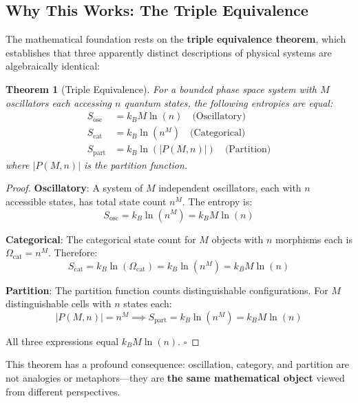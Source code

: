 \documentclass[twocolumn,10pt]{article}
\newtheorem{theorem}{Theorem}[section]
\theoremstyle{definition}
\theoremstyle{remark}
\begin{document}
\subsection{Why This Works: The Triple Equivalence}

The mathematical foundation rests on the \textbf{triple equivalence theorem}, which establishes that three apparently distinct descriptions of physical systems are algebraically identical:

\begin{theorem}[Triple Equivalence]
\label{thm:triple_equiv}
For a bounded phase space system with $M$ oscillators each accessing $n$ quantum states, the following entropies are equal:
\begin{align}
    S_{\text{osc}} &= k_B M \ln(n) \quad \text{(Oscillatory)} \\
    S_{\text{cat}} &= k_B \ln(n^M) \quad \text{(Categorical)} \\
    S_{\text{part}} &= k_B \ln(|P(M,n)|) \quad \text{(Partition)}
\end{align}
where $|P(M,n)|$ is the partition function.
\end{theorem}

\begin{proof}
\textbf{Oscillatory}: A system of $M$ independent oscillators, each with $n$ accessible states, has total state count $n^M$. The entropy is:
\begin{equation}
    S_{\text{osc}} = k_B \ln(n^M) = k_B M \ln(n)
\end{equation}

\textbf{Categorical}: The categorical state count for $M$ objects with $n$ morphisms each is $\Omega_{\text{cat}} = n^M$. Therefore:
\begin{equation}
    S_{\text{cat}} = k_B \ln(\Omega_{\text{cat}}) = k_B \ln(n^M) = k_B M \ln(n)
\end{equation}

\textbf{Partition}: The partition function counts distinguishable configurations. For $M$ distinguishable cells with $n$ states each:
\begin{equation}
    |P(M,n)| = n^M \implies S_{\text{part}} = k_B \ln(n^M) = k_B M \ln(n)
\end{equation}

All three expressions equal $k_B M \ln(n)$. $\square$
\end{proof}

This theorem has a profound consequence: oscillation, category, and partition are not analogies or metaphors—they are \textbf{the same mathematical object} viewed from different perspectives.
\end{document}
